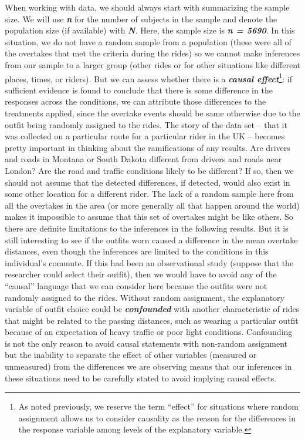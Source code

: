 \documentclass[
]{book}
\begin{document}
\indent When working with data, we should always start with
summarizing the sample size. We will use \textbf{\emph{n}}  for the
number of subjects in the sample and denote the population size (if
available) with \textbf{\emph{N}}.  Here, the sample size is \textbf{\emph{n = 5690}}. In
this situation, we do not have a random sample from a population 
(these were all of the overtakes that met the criteria during the rides) so we cannot make inferences from our sample to a larger group (other rides or for other situations like different places, times, or riders).
But we can assess whether there is a  \textbf{\emph{causal effect}}\footnote{As noted previously, we reserve the term ``effect'' for situations where random assignment  allows us to consider causality as the reason for the differences in the response variable among levels of the explanatory variable.}: if sufficient evidence is found to conclude that there is some difference in
the responses across the conditions, we can attribute those differences to
the treatments applied, since the overtake events should be same otherwise due to the
outfit being randomly assigned to the rides. The story of the data set --
that it was collected on a particular route for a particular rider in the UK -- becomes pretty important in thinking about
the ramifications of any results. Are drivers and roads in Montana or South Dakota different from drivers and roads near London? Are the road and traffic conditions likely to be different? If so,
then we should not assume that the detected differences, if detected, would
also exist in some other location for a different rider. The lack of a random sample  here from all the overtakes in the area (or more generally all that happen around the world) makes it impossible to assume that this set of overtakes might be like others. So there are definite limitations to the inferences in the following
results. But it is still interesting to see if the outfits worn caused a difference
in the mean overtake distances, even though the inferences are limited to the conditions in this individual's commute. If this had been an observational study (suppose that the
researcher could select their outfit), then we would have to avoid
any of the ``causal'' language that we can consider here because the outfits
were not randomly assigned to the rides. Without random assignment,  the
explanatory variable of outfit choice could be \textbf{\emph{confounded}} 
with another characteristic of rides that might be related to the passing distances, such as wearing a particular outfit because of an expectation of heavy traffic or poor light conditions. Confounding is not the only reason to avoid causal
statements with non-random assignment but the inability to separate the effect
of other variables (measured or unmeasured) from the differences we are
observing means that our inferences in these situations need to be carefully
stated to avoid implying causal effects.
\end{document}
